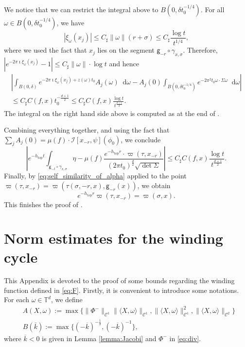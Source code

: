 \documentclass[11pt,letterpaper]{amsart}
\newcommand \T {{ \mathbb T}}
\newcommand \cC {{\mathscr{C}}}
\newcommand \sC {{C_\sharp}}
\newcommand{\geo}{\mathsf{g}}
\newcommand*{\diff}{\mathop{}\!\mathrm{d}}
\DeclareMathOperator{\topp}{top}
\theoremstyle{definition}
\begin{document}
We notice that we can restrict the integral above to $B(0,\delta t_0^{-1/4})$. For all $\omega \in B(0,\delta t_0^{-1/4})$, we have
\[
\left\lvert  \xi_{\omega}(x_{j}) \right\rvert \leq \sC \|\omega\| (r+\sigma) \leq \sC \frac{\log t}{t^{1/4}},
\]
where we used the fact that $x_j$ lies on the segment $\geo_{-r}\circ \gamma_{x,\sigma}$.
Therefore, $|e^{- 2 \pi \imath \xi_{\omega}(x_{j})} -1| \leq \sC \|\omega\| \cdot \log t$ and hence 
\begin{multline*}
	\left\lvert \int_{B(0,\delta)} e^{- 2 \pi \imath \xi_{\omega}(x_{j})+z(\omega) t_0 } A_j(\omega) \diff \omega - %
A_j(0) \int_{B(0,\delta t_0^{-1/4})} e^{ -2\pi^2 t_0 \omega \cdot \Sigma \omega }  \diff \omega \right\rvert \\ 
	\leq \sC C(f,x) t_0^{-\frac{d+1}{2}}\leq \sC C(f,x) \frac{\log t}{ t^{\frac{d+1}{2}}}.
\end{multline*} 
The integral on the right hand side above is computed as at the end of  .

Combining everything together, and using the fact that $\sum_j A_j(0) = \mu(f) \cdot \mathcal{I}[x_{-r},\psi](\phi_0)$, we conclude
\[
\left\lvert e^{-h_{\topp} t}\int_{\geo_{-t} \circ \gamma_{x, \sigma}} \eta - \mu(f) \frac{e^{-h_{\topp} r} \cdot \varpi(\tau,x_{-r})}{(2\pi  t_0)^{\frac{d}{2}}\sqrt{\det \Sigma}} \right\rvert \leq \sC C(f,x) \frac{\log t}{ t^{\frac{d+1}{2}}}.
\]
Finally, by  \eqref{eq:self_similarity_of_alpha} applied to the point $\varpi(\tau,x_{-r}) = \varpi(\tau(\sigma,-r,x),\geo_{-r}(x))$, we obtain
\[
e^{-h_{\topp} r} \varpi(\tau,x_{-r}) = \varpi(\sigma,x).
\]
This finishes the proof of .






\appendix
\section{Norm estimates for the winding cycle}\label{sec:app-G}
This Appendix is devoted to the proof of some bounds regarding the winding function defined in \eqref{eq:F}. Firstly, it is convenient to introduce some notations.
For each $\omega \in \T^d$, we define
\begin{equation}\label{eq:AB}
\begin{split}
&A(X,\omega):= \max\{\|\Phi^-\|_{\cC^1}\|\langle X, \omega \rangle\|_{\cC^1}, \|\langle X, \omega \rangle\|_{\cC^1}^2, \|\langle X, \omega \rangle\|_{\cC^2}\}\\
&B(\bar k):= \max\{(-\overline k)^{-\frac 12}, (-\overline k)^{-1}\},
\end{split}
\end{equation}\label{eq:Cvar}
where ${\overline k}<0$ is given in Lemma \ref{lemma:Jacobi} and $\Phi^-$ in \eqref{eq:div}. 
\end{document}
